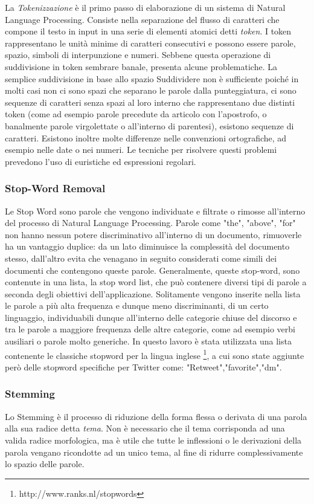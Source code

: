 La \emph{Tokenizzazione} è il primo passo di elaborazione di un sistema di Natural Language
Processing. Consiste nella separazione del flusso di caratteri che compone il testo
in input in una serie di elementi atomici detti \emph{token}. I token rappresentano le
unità minime di caratteri consecutivi e possono essere parole, spazio, simboli di
interpunzione e numeri. Sebbene questa operazione di suddivisione in token 
sembrare banale, presenta alcune problematiche. La semplice suddivisione in base allo spazio Suddividere non è sufficiente poiché in molti casi non
ci sono spazi che separano le parole dalla punteggiatura, ci sono sequenze di caratteri senza spazi al loro interno che rappresentano due distinti token (come ad esempio parole precedute da articolo con l'apostrofo, o banalmente parole virgolettate o all'interno di parentesi), esistono sequenze di caratteri. Esistono inoltre molte differenze nelle convenzioni ortografiche, ad esempio nelle date o nei numeri. 
Le tecniche per risolvere questi problemi prevedono l'uso di euristiche ed  espressioni regolari.
 
\subsubsection{Stop-Word Removal}

Le Stop Word sono parole che vengono individuate e filtrate o rimosse all'interno del processo di Natural Language Processing.
Parole come "the", "above", "for" non hanno nessun potere discriminativo all'interno di un documento, rimuoverle ha un vantaggio duplice: da un lato diminuisce la complessità del documento stesso, dall'altro evita che venagano in seguito considerati come simili dei documenti che contengono queste parole.
Generalmente, queste stop-word, sono contenute in una lista, la stop word list, che può contenere diversi tipi di parole a seconda degli obiettivi dell'applicazione. Solitamente vengono inserite nella lista le parole a più alta frequenza e dunque meno discriminanti, di un certo linguaggio, individuabili dunque all'interno delle categorie chiuse del discorso e tra le parole a maggiore frequenza
delle altre categorie, come ad esempio verbi ausiliari o parole molto generiche. In questo lavoro è stata utilizzata una lista contenente le classiche stopword per la lingua inglese \footnote{http://www.ranks.nl/stopwords}, a cui sono state aggiunte però
delle stopword specifiche per Twitter come: "Retweet","favorite","dm".
\subsubsection{Stemming}
Lo Stemming è il processo di riduzione della forma flessa o derivata di una parola alla sua radice detta \emph{tema}. 
Non è necessario che il tema corrisponda ad una valida radice morfologica, ma è utile che tutte le inflessioni o le derivazioni della parola
vengano ricondotte ad un unico tema, al fine di ridurre complessivamente lo spazio delle parole. 

